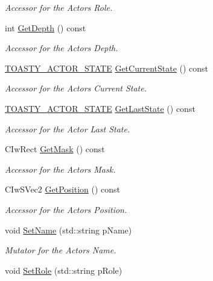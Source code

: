 \begin{DoxyCompactItemize}
\begin{DoxyCompactList}\small\item\em Accessor for the Actors Role. \end{DoxyCompactList}\item 
int \hyperlink{class_i_ty_actor_a3a317a12d0872943894aef2ab1395c7c}{GetDepth} () const 
\begin{DoxyCompactList}\small\item\em Accessor for the Actors Depth. \end{DoxyCompactList}\item 
\hyperlink{_ty_actor_8h_aceba83227db82b051b04ff8e90d63a51}{TOASTY\_\-ACTOR\_\-STATE} \hyperlink{class_i_ty_actor_adc9729b29f07da02bbfa26d423901b45}{GetCurrentState} () const 
\begin{DoxyCompactList}\small\item\em Accessor for the Actors Current State. \end{DoxyCompactList}\item 
\hyperlink{_ty_actor_8h_aceba83227db82b051b04ff8e90d63a51}{TOASTY\_\-ACTOR\_\-STATE} \hyperlink{class_i_ty_actor_ab1c7d4089d543bf258e02854c00969f0}{GetLastState} () const 
\begin{DoxyCompactList}\small\item\em Accessor for the Actor Last State. \end{DoxyCompactList}\item 
CIwRect \hyperlink{class_i_ty_actor_a029053700af64bae8290b5dcfa04ceec}{GetMask} () const 
\begin{DoxyCompactList}\small\item\em Accessor for the Actors Mask. \end{DoxyCompactList}\item 
CIwSVec2 \hyperlink{class_i_ty_actor_a545fb58ad751ccbc8a33729ede2b7415}{GetPosition} () const 
\begin{DoxyCompactList}\small\item\em Accessor for the Actors Position. \end{DoxyCompactList}\item 
void \hyperlink{class_i_ty_actor_a3ecdf0c6c1502c4b5a4a7227811ad0e3}{SetName} (std::string pName)
\begin{DoxyCompactList}\small\item\em Mutator for the Actors Name. \end{DoxyCompactList}\item 
void \hyperlink{class_i_ty_actor_abbf80ab3261ea1ffa4a83e8958f486bd}{SetRole} (std::string pRole)

\end{DoxyCompactItemize}
